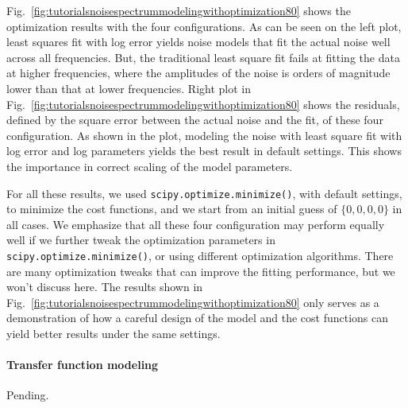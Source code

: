 Fig.~\ref{fig:tutorialsnoisespectrummodelingwithoptimization80} shows the optimization results with the four configurations.
As can be seen on the left plot, least squares fit with log error yields noise models that fit the actual noise well across all frequencies.
But, the traditional least square fit fails at fitting the data at higher frequencies, where the amplitudes of the noise is orders of magnitude lower than that at lower frequencies.
Right plot in Fig.~\ref{fig:tutorialsnoisespectrummodelingwithoptimization80} shows the residuals, defined by the square error between the actual noise and the fit, of these four configuration.
As shown in the plot, modeling the noise with least square fit with log error and log parameters yields the best result in default settings.
This shows the importance in correct scaling of the model parameters.

For all these results, we used \verb|scipy.optimize.minimize()|, with default settings, to minimize the cost functions, and we start from an initial guess of $\{0, 0, 0, 0\}$ in all cases.
We emphasize that all these four configuration may perform equally well if we further tweak the optimization parameters in \verb|scipy.optimize.minimize()|, or using different optimization algorithms.
There are many optimization tweaks that can improve the fitting performance, but we won't discuss here.
The results shown in Fig.~\ref{fig:tutorialsnoisespectrummodelingwithoptimization80} only serves as a demonstration of how a careful design of the model and the cost functions can yield better results under the same settings.

\paragraph{Transfer function modeling}

Pending.